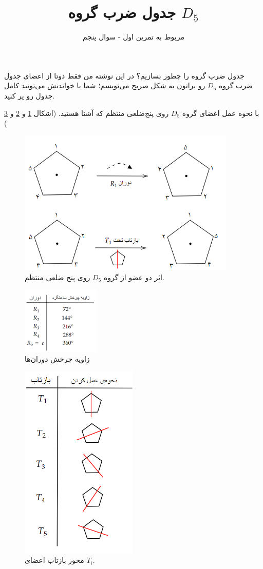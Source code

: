 \documentclass[a4paper, 12pt]{article}
\title{\textbf{
جدول ضرب گروه 
$D_5$
}}
\author{مربوط به تمرین اول - سوال پنجم}
\date{}
\begin{document}
\maketitle
جدول ضرب گروه را چطور بسازیم؟
در این نوشته من فقط دوتا از اعضای جدول ضرب گروه 
$D_5$
رو براتون به شکل صریح می‌نویسم؛ شما با خواندنش می‌تونید کامل جدول رو پر کنید.

\vspace{1em}
\noindent
با نحوه عمل اعضای گروه 
$D_5$
روی پنج‌ضلعی منتظم که آشنا هستید. (اشکال
\ref{ac1}
و
\ref{ac2}
و 
\ref{ac3}
)

\begin{figure}[h]
	\centering
	\includegraphics[width=28em]{1.png}
	\caption{اثر دو عضو از گروه
	$D_5$
	روی پنج ضلعی منتظم. }
	\label{ac1}
\end{figure}
\begin{figure}[h]
	\centering
	\includegraphics[width=10em]{2.png}
	\caption{زاویه چرخش دوران‌ها }
	\label{ac2}
\end{figure}
\begin{figure}[h]
	\centering
	\includegraphics[width=15em]{3.png}
	\caption{محور بازتاب اعضای
	$T_i$. }
	\label{ac3}
\end{figure}
\end{document}
